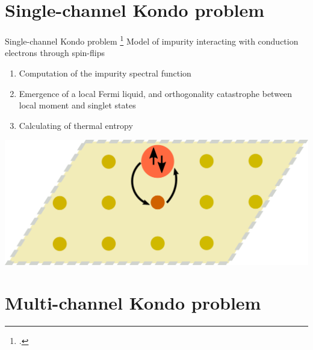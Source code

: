 \documentclass[11pt,aspectratio=169]{beamer}
\begin{document}
\section{Single-channel Kondo problem}

\begin{frame}{Single-channel Kondo problem}
\footcite{kondo1964resistance,wilson1975,andreiKondoreview,hewson1993,nozieres1974fermi,anderson1970,tsvelickKondoreview,affleck1993exact,Goldhaber-Gordon1998,Borzenets2020,sakai_osamu_shimizu,costi_hewson_1990,nozaki2012,affleck1995conformal}
Model of impurity interacting with conduction electrons through spin-flips\\[20pt]

\begin{minipage}{0.59\textwidth}
\begin{enumerate}
\item Computation of the impurity spectral function\\[20pt]
\item Emergence of a local Fermi liquid, and orthogonality catastrophe between local moment and singlet states\\[20pt]
\item Calculating of thermal entropy\\[20pt]
\end{enumerate}
\end{minipage}
\begin{minipage}{0.4\textwidth}
	\includegraphics[width=\textwidth]{kondo-effect.pdf}
\end{minipage}

\end{frame}

\section{Multi-channel Kondo problem}
\end{document}
